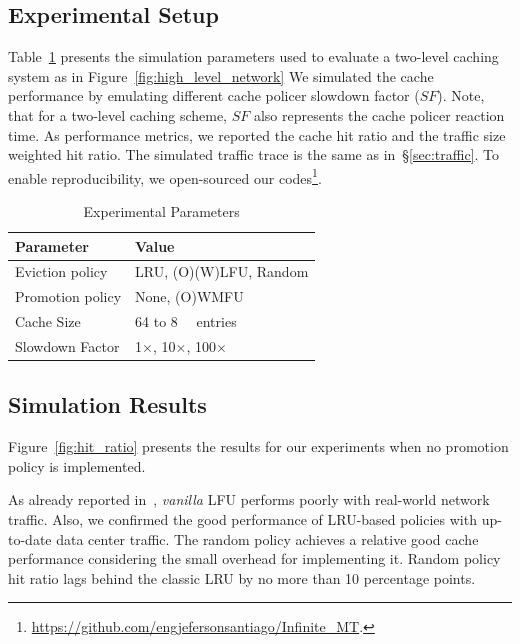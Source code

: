\subsection{Experimental Setup}
Table~\ref{tab:setup} presents the simulation parameters used to evaluate a two-level caching system as in Figure~\ref{fig:high_level_network}
We simulated the cache performance by emulating different cache policer slowdown factor ($SF$).
Note, that for a two-level caching scheme, $SF$ also represents the cache policer reaction time.
As performance metrics, we reported the cache hit ratio and the traffic size weighted hit ratio.
The simulated traffic trace is the same as in~\S\ref{sec:traffic}.
To enable reproducibility, we open-sourced our codes\footnote{\url{https://github.com/engjefersonsantiago/Infinite_MT}.}.


\begin{table}[h]
	\centering
	\caption{Experimental Parameters}
	\label{tab:setup}
	\begin{tabular}{l|l}
		\toprule
		\textbf{Parameter}       & \textbf{Value}   \\
		\midrule
		Eviction policy            & LRU, (O)(W)LFU, Random			    \\
		Promotion policy            & None, (O)WMFU			    \\
		Cache Size              & 64 to \SI{8}{\kilo\nothing} entries  \\
		Slowdown Factor         & 1$\times$, 10$\times$, 100$\times$        \\
		\bottomrule
	\end{tabular}
\end{table}

\subsection{Simulation Results}
Figure~\ref{fig:hit_ratio} presents the results for our experiments when no promotion policy is implemented.

As already reported in~\cite{Kim:09}, \textit{vanilla} LFU performs poorly with real-world network traffic.
Also, we confirmed the good performance of LRU-based policies with up-to-date data center traffic. 
The random policy achieves a relative good cache performance considering the small overhead for implementing it.
Random policy hit ratio lags behind the classic LRU by no more than 10 percentage points.

